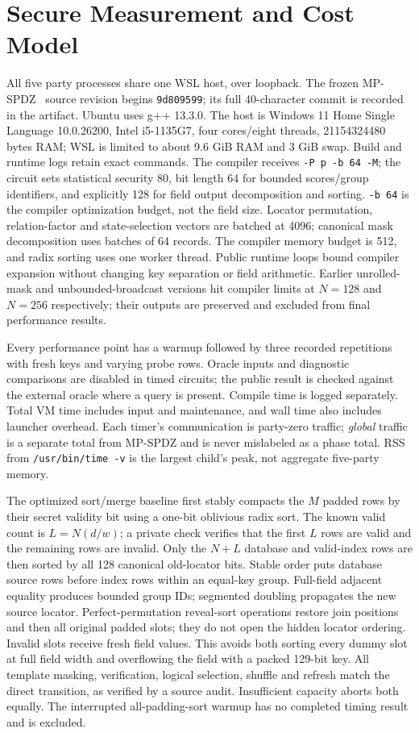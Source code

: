 \documentclass[journal,onecolumn]{IEEEtran}
\begin{document}
\section{Secure Measurement and Cost Model}
All five party processes share one WSL host, over loopback. The frozen MP-SPDZ~\cite{keller2020mpspdz} source revision begins \texttt{9d809599}; its full 40-character commit is recorded in the artifact. Ubuntu uses g++ 13.3.0. The host is Windows 11 Home Single Language 10.0.26200, Intel i5-1135G7, four cores/eight threads, 21154324480 bytes RAM; WSL is limited to about 9.6 GiB RAM and 3 GiB swap. Build and runtime logs retain exact commands. The compiler receives \texttt{-P p -b 64 -M}; the circuit sets statistical security 80, bit length 64 for bounded scores/group identifiers, and explicitly 128 for field output decomposition and sorting. \texttt{-b 64} is the compiler optimization budget, not the field size. Locator permutation, relation-factor and state-selection vectors are batched at 4096; canonical mask decomposition uses batches of 64 records. The compiler memory budget is 512, and radix sorting uses one worker thread. Public runtime loops bound compiler expansion without changing key separation or field arithmetic. Earlier unrolled-mask and unbounded-broadcast versions hit compiler limits at $N=128$ and $N=256$ respectively; their outputs are preserved and excluded from final performance results.

Every performance point has a warmup followed by three recorded repetitions with fresh keys and varying probe rows. Oracle inputs and diagnostic comparisons are disabled in timed circuits; the public result is checked against the external oracle where a query is present. Compile time is logged separately. Total VM time includes input and maintenance, and wall time also includes launcher overhead. Each timer's communication is party-zero traffic; \emph{global} traffic is a separate total from MP-SPDZ and is never mislabeled as a phase total. RSS from \texttt{/usr/bin/time -v} is the largest child's peak, not aggregate five-party memory.

The optimized sort/merge baseline first stably compacts the $M$ padded rows by their secret validity bit using a one-bit oblivious radix sort. The known valid count is $L=N(d/w)$; a private check verifies that the first $L$ rows are valid and the remaining rows are invalid. Only the $N+L$ database and valid-index rows are then sorted by all 128 canonical old-locator bits. Stable order puts database source rows before index rows within an equal-key group. Full-field adjacent equality produces bounded group IDs; segmented doubling propagates the new source locator. Perfect-permutation reveal-sort operations restore join positions and then all original padded slots; they do not open the hidden locator ordering. Invalid slots receive fresh field values. This avoids both sorting every dummy slot at full field width and overflowing the field with a packed 129-bit key. All template masking, verification, logical selection, shuffle and refresh match the direct transition, as verified by a source audit. Insufficient capacity aborts both equally. The interrupted all-padding-sort warmup has no completed timing result and is excluded.
\end{document}

